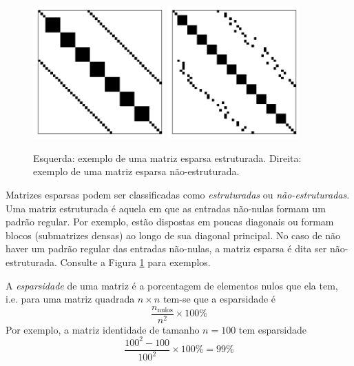 \begin{figure}[H]
  \centering
  \includegraphics[width=0.45\textwidth]{./cap_sislin/dados/matriz_esparsa_estruturada/main}
  \includegraphics[width=0.45\textwidth]{./cap_sislin/dados/matriz_esparsa_nao_estruturada/main}
  \caption{Esquerda: exemplo de uma matriz esparsa estruturada. Direita: exemplo de uma matriz esparsa não-estruturada.}
  \label{fig:ex_matriz_esparsa_estrutura}
\end{figure}

Matrizes esparsas podem ser classificadas como \emph{estruturadas} ou \emph{não-estruturadas}. Uma matriz estruturada é aquela em que as entradas não-nulas formam um padrão regular. Por exemplo, estão dispostas em poucas diagonais ou formam blocos (submatrizes densas) ao longo de sua diagonal principal. No caso de não haver um padrão regular das entradas não-nulas, a matriz esparsa é dita ser não-estruturada. Consulte a Figura \ref{fig:ex_matriz_esparsa_estrutura} para exemplos.

A \emph{esparsidade} de uma matriz é a porcentagem de elementos nulos que ela tem, i.e. para uma matriz quadrada $n\times n$ tem-se que a esparsidade é
\begin{equation}
  \frac{n_{\text{nulos}}}{n^2}\times 100\%
\end{equation}
Por exemplo, a matriz identidade de tamanho $n=100$ tem esparsidade
\begin{equation}
  \frac{100^2 - 100}{100^2}\times 100\% = 99\% 
\end{equation}

